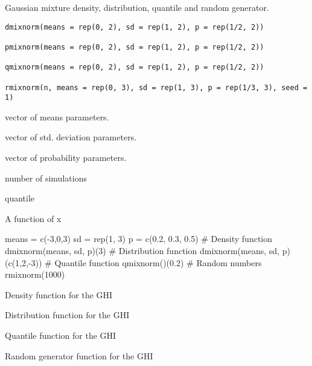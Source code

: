 \documentclass[a4paper]{book}
\begin{document}
%
\begin{Description}\relax
Gaussian mixture density, distribution, quantile and random generator.
\end{Description}
%
\begin{Usage}
\begin{verbatim}
dmixnorm(means = rep(0, 2), sd = rep(1, 2), p = rep(1/2, 2))

pmixnorm(means = rep(0, 2), sd = rep(1, 2), p = rep(1/2, 2))

qmixnorm(means = rep(0, 2), sd = rep(1, 2), p = rep(1/2, 2))

rmixnorm(n, means = rep(0, 3), sd = rep(1, 3), p = rep(1/3, 3), seed = 1)
\end{verbatim}
\end{Usage}
%
\begin{Arguments}
\begin{ldescription}
\item[\code{means}] vector of means parameters.

\item[\code{sd}] vector of std. deviation parameters.

\item[\code{p}] vector of probability parameters.

\item[\code{n}] number of simulations

\item[\code{x}] quantile
\end{ldescription}
\end{Arguments}
%
\begin{Value}
A function of x
\end{Value}
%
\begin{Examples}
\begin{ExampleCode}
means = c(-3,0,3)
sd = rep(1, 3)
p = c(0.2, 0.3, 0.5)
# Density function
dmixnorm(means, sd, p)(3)
# Distribution function
dmixnorm(means, sd, p)(c(1,2,-3))
# Quantile function
qmixnorm()(0.2)
# Random numbers
rmixnorm(1000)
\end{ExampleCode}
\end{Examples}
%
\begin{Description}\relax
Density function for the GHI

Distribution function for the GHI

Quantile function for the GHI

Random generator function for the GHI
\end{Description}
\end{document}
